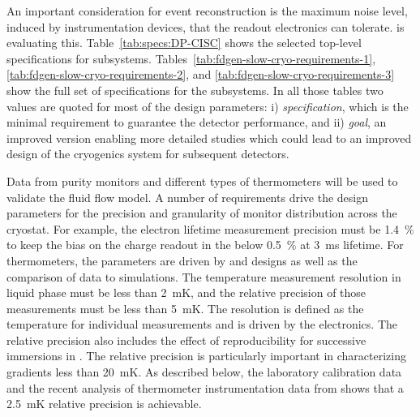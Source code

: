 An important consideration for event reconstruction is the maximum noise level, induced by instrumentation devices, that the readout electronics  can tolerate.  is evaluating this. Table~\ref{tab:specs:DP-CISC} shows the selected top-level specifications for  subsystems. 
Tables~\ref{tab:fdgen-slow-cryo-requirements-1}, \ref{tab:fdgen-slow-cryo-requirements-2}, and \ref{tab:fdgen-slow-cryo-requirements-3} show the full set of specifications
for the  subsystems. In all those tables two values are quoted for most of the design parameters: i) {\it specification}, which is the minimal requirement to guarantee the detector performance, and ii) {\it goal},  an improved version enabling more detailed studies which could lead to an improved design of the cryogenics system for subsequent detectors. 

Data from purity monitors and different types of thermometers will be used to validate the \lar fluid flow model. 
A number of requirements drive the design parameters for the precision and granularity of monitor distribution across the cryostat. 
For example, the electron lifetime measurement precision must be \SI{1.4}{\%} to keep the bias on the charge readout in the  below \SI{0.5}{\%} at \SI{3}{ms} lifetime.
 For thermometers, the %
parameters are driven by  and   designs as well as the comparison of  data to  simulations. The temperature measurement resolution in liquid phase must be less than \SI{2}{mK}, and the relative precision of those measurements must be less than \SI{5}{mK}. The resolution is defined as the temperature  for individual measurements and is driven by the electronics. The relative precision also includes the effect of reproducibility for successive immersions in . 
The relative precision is particularly important in characterizing %
gradients less than \SI{20}{mK}. %
As described below, the laboratory calibration data and the recent analysis of thermometer instrumentation data from  shows that a \SI{2.5}{mK} relative precision is achievable. 


